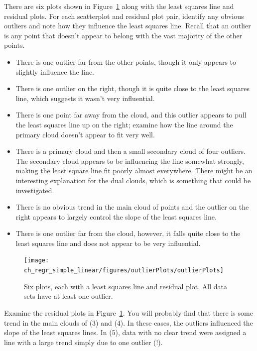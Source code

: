 \begin{example}{There are six plots shown in Figure~\ref{outlierPlots} along with the least squares line and residual plots. For each scatterplot and residual plot pair, identify any obvious outliers and note how they influence the least squares line. Recall that an outlier is any point that doesn't appear to belong with the vast majority of the other points.}\label{outlierPlotsExample}
\begin{itemize}
\item[(1)] There is one outlier far from the other points, though it only appears to slightly influence the line.
\item[(2)] There is one outlier on the right, though it is quite close to the least squares line, which suggests it wasn't very influential.
\item[(3)] There is one point far away from the cloud, and this outlier appears to pull the least squares line up on the right; examine how the line around the primary cloud doesn't appear to fit very well.
\item[(4)] There is a primary cloud and then a small secondary cloud of four outliers. The secondary cloud appears to be influencing the line somewhat strongly, making the least square line fit poorly almost everywhere. There might be an interesting explanation for the dual clouds, which is something that could be investigated.
\item[(5)] There is no obvious trend in the main cloud of points and the outlier on the right appears to largely control the slope of the least squares line.
\item[(6)] There is one outlier far from the cloud, however, it falls quite close to the least squares line and does not appear to be very influential.
\end{itemize}
\end{example}

\begin{figure}
\centering
\texttt{[image: ch\_regr\_simple\_linear/figures/outlierPlots/outlierPlots]}
\caption{Six plots, each with a least squares line and residual plot. All data sets have at least one outlier.}
\label{outlierPlots}
\end{figure}

Examine the residual plots in Figure~\ref{outlierPlots}. You will probably find that there is some trend in the main clouds of (3) and (4). In these cases, the outliers influenced the slope of the least squares lines. In (5), data with no clear trend were assigned a line with a large trend simply due to one outlier (!).
 
